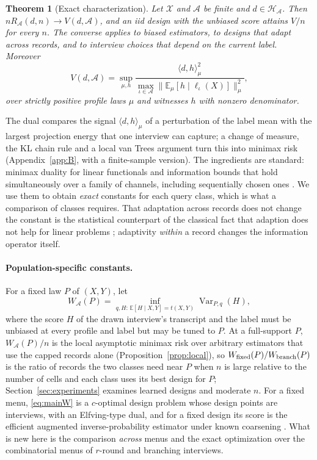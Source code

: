 \documentclass{article}
\newtheorem{theorem}{Theorem}
\newcommand{\E}{\mathbb{E}}
\newcommand{\Var}{\operatorname{Var}}
\newcommand{\X}{\mathcal X}
\newcommand{\A}{\mathcal A}
\newcommand{\Hh}{\mathcal H}
\begin{document}
\begin{theorem}[Exact characterization]\label{thm:char}
Let $\X$ and $\A$ be finite and $d\in\Hh_\A$. Then $nR_\A(d,n)\to V(d,\A)$, and an iid design with the unbiased score attains $V/n$ for every $n$. The converse applies to biased estimators, to designs that adapt across records, and to interview choices that depend on the current label. Moreover
\[
 V(d,\A)=\sup_{\mu,h}\frac{\langle d,h\rangle_\mu^2}{\max_{\iota\in\A}\|\E_\mu[h\mid\ell_\iota(X)]\|_\mu^2},
\]
over strictly positive profile laws $\mu$ and witnesses $h$ with nonzero denominator.
\end{theorem}
The dual compares the signal $\langle d,h\rangle_\mu$ of a perturbation of the label mean with the largest projection energy that one interview can capture; a change of measure, the KL chain rule and a local van Trees argument turn this into minimax risk (Appendix~\ref{app:B}, with a finite-sample version). The ingredients are standard: minimax duality for linear functionals \citep{donoho1994,juditsky2009,polyanskiy2026} and information bounds that hold simultaneously over a family of channels, including sequentially chosen ones \citep{acharya2019,barnes2020}. We use them to obtain \emph{exact} constants for each query class, which is what a comparison of classes requires. That adaptation across records does not change the constant is the statistical counterpart of the classical fact that adaption does not help for linear problems \citep{bakhvalov1971,novak1996}; adaptivity \emph{within} a record changes the information operator itself.

\paragraph{Population-specific constants.}
For a fixed law $P$ of $(X,Y)$, let
\begin{equation}
 W_{\A}(P)=\inf_{q,H:\,\E[H\mid X,Y]=t(X,Y)}\Var_{P,q}(H),\label{eq:mainW}
\end{equation}
where the score $H$ of the drawn interview's transcript and the label must be unbiased at every profile and label but may be tuned to $P$. At a full-support $P$, $W_\A(P)/n$ is the local asymptotic minimax risk over arbitrary estimators that use the capped records alone (Proposition~\ref{prop:local}), so $W_{\rm fixed}(P)/W_{\rm branch}(P)$ is the ratio of records the two classes need near $P$ when $n$ is large relative to the number of cells and each class uses its best design for $P$; Section~\ref{sec:experiments} examines learned designs and moderate $n$. For a fixed menu, \eqref{eq:mainW} is a $c$-optimal design problem whose design points are interviews, with an Elfving-type dual, and for a fixed design its score is the efficient augmented inverse-probability estimator under known coarsening \citep{elfving1952,pukelsheim1993,robins1994,tsiatis2006}. What is new here is the comparison \emph{across} menus and the exact optimization over the combinatorial menus of $r$-round and branching interviews.
\end{document}
